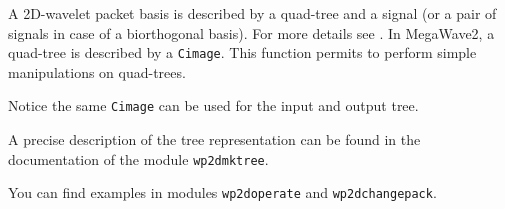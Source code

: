 A 2D-wavelet packet basis is described by a quad-tree and a signal (or a pair
of signals in case of a biorthogonal basis). 
For more details see \cite{mallat:wavelet}. In MegaWave2, a
quad-tree is described by a \verb+Cimage+. This function permits to perform
simple manipulations on quad-trees.

Notice the same \verb+Cimage+ can be used for the input and output tree.

A precise description of the tree representation can be
found in the documentation of the module \verb+wp2dmktree+.

You can find examples in modules \verb+wp2doperate+ and \verb+wp2dchangepack+.

